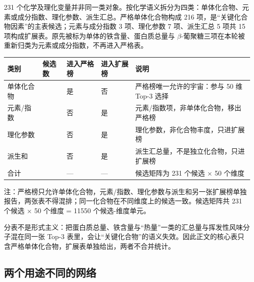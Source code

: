 \documentclass[11pt,a4paper]{article}
\newenvironment{bptable}{%
  \par\medskip\noindent\begin{minipage}{\linewidth}\centering
}{%
  \end{minipage}\par\medskip
}
\newenvironment{tablenote}{%
  \par\smallskip\noindent\footnotesize
  \setlength{\parindent}{0pt}\setlength{\parskip}{0pt}%
  \raggedright
}{%
  \par\medskip
}
\begin{document}
231
个化学及理化变量并非同一类对象。按化学语义拆分为四类：单体化合物、元素或成分指数、理化参数、派生汇总。严格单体化合物构成
216 项，是``关键化合物因素''的主表候选；元素与成分指数 3 项、理化参数 7
项、派生汇总 5 项共 15
项构成扩展表。原先被标为单体的铁含量、蛋白质总量与
\(\beta\)-葡聚糖三项在本轮被重新归类为元素或成分指数，不再进入严格表。

\begin{bptable}
\setcounter{table}{5}
\label{tab:q2-universe}
\par\smallskip
\small
\begin{tabular}{@{}>{\raggedright\arraybackslash}p{}>{\raggedleft\arraybackslash}p{}>{\raggedright\arraybackslash}p{}>{\raggedright\arraybackslash}p{}>{\raggedright\arraybackslash}p{}@{}}
\toprule
类别 & 候选数 & 进入严格榜 & 进入扩展榜 & 说明 \\
\midrule
单体化合物 & 216 & 是 & 否 & 严格榜唯一允许的宇宙：参与 50 维 Top-3 选择 \\
元素/\allowbreak{}指数 & 3 & 否 & 是 & 元素/\allowbreak{}指数项，非单体化合物，移出严格榜 \\
理化参数 & 7 & 否 & 是 & 理化参数，非化合物丰度，只进扩展榜 \\
派生和 & 5 & 否 & 是 & 派生汇总量，不是独立化合物，只进扩展榜 \\
合计 & 231 & — & — & 候选矩阵为 231 个候选 × 50 个维度 \\
\bottomrule
\end{tabular}
\begin{tablenote}注：严格榜只允许单体化合物，元素/指数、理化参数与派生和另一张扩展榜单独报告，两张表不得混排；同一化合物在不同维度上的候选一致。候选矩阵共 231 个候选 × 50 个维度 = 11550 个候选-维度单元。\end{tablenote}
\end{bptable}

分表不是形式主义：把蛋白质总量、铁含量与``热量''一类的汇总量与挥发性风味分子混在同一张
Top-3
表里，会让``关键化合物''的语义失效。因此正文的核心表只含严格单体化合物，扩展表单独给出，两者不合并统计。

\subsection{两个用途不同的网络}\label{ux4e24ux4e2aux7528ux9014ux4e0dux540cux7684ux7f51ux7edc}
\end{document}
